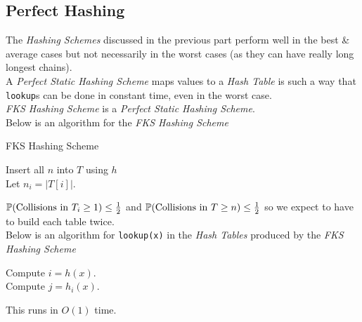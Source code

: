 \documentclass[11pt,a4paper]{article}
\begin{document}
\subsection{Perfect Hashing}

The \textit{Hashing Schemes} discussed in the previous part perform well in the best \& average cases but not necessarily in the worst cases (as they can have really long longest chains).\\

A \textit{Perfect Static Hashing Scheme} maps values to a \textit{Hash Table} is such a way that \lstinline!lookup!s can be done in constant time, even in the worst case.\\
\nb \textit{FKS Hashing Scheme} is a \textit{Perfect Static Hashing Scheme}.\\

Below is an algorithm for the \textit{FKS Hashing Scheme}\\
\begin{algorithm}[H]
\caption{FKS Hashing Scheme}
Insert all $n$ into $T$ using $h$\\
Let $n_i=|T[i]|$.\\
\end{algorithm}
\nb $\mathbb{P}(\text{Collisions in }T_i\geq1)\leq\frac12$ and \nb $\mathbb{P}(\text{Collisions in }T\geq n)\leq\frac12$ so we expect to have to build each table twice.\\

Below is an algorithm for \lstinline!lookup(x)! in the \textit{Hash Tables} produced by the \textit{FKS Hashing Scheme}
\begin{algorithm}[H]
\caption{FKS - \lstinline!lookup(x)!}
Compute $i=h(x)$.\\
Compute $j=h_i(x)$.\\
\end{algorithm}
\nb This runs in $O(1)$ time.\\
\end{document}

